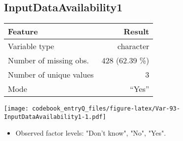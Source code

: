 \documentclass[]{article}
\providecommand{\tightlist}{%
  \setlength{\itemsep}{0pt}\setlength{\parskip}{0pt}}
\newcommand{\fullline}{\noindent\makebox[\linewidth]{\rule{\textwidth}{0.4pt}}}
\newcommand{\bminione}{\begin{minipage}{0.75 \textwidth}}
\newcommand{\bminitwo}{\begin{minipage}{0.25 \textwidth}}
\newcommand{\emini}{\end{minipage}}
\begin{document}
\fullline

\hypertarget{inputdataavailability1}{\subsection{InputDataAvailability1}\label{inputdataavailability1}}

\bminione

\begin{longtable}[]{@{}lr@{}}
\toprule
\begin{minipage}[b]{0.34\columnwidth}\raggedright\strut
Feature\strut
\end{minipage} & \begin{minipage}[b]{0.20\columnwidth}\raggedleft\strut
Result\strut
\end{minipage}\tabularnewline
\midrule
\endhead
\begin{minipage}[t]{0.34\columnwidth}\raggedright\strut
Variable type\strut
\end{minipage} & \begin{minipage}[t]{0.20\columnwidth}\raggedleft\strut
character\strut
\end{minipage}\tabularnewline
\begin{minipage}[t]{0.34\columnwidth}\raggedright\strut
Number of missing obs.\strut
\end{minipage} & \begin{minipage}[t]{0.20\columnwidth}\raggedleft\strut
428 (62.39 \%)\strut
\end{minipage}\tabularnewline
\begin{minipage}[t]{0.34\columnwidth}\raggedright\strut
Number of unique values\strut
\end{minipage} & \begin{minipage}[t]{0.20\columnwidth}\raggedleft\strut
3\strut
\end{minipage}\tabularnewline
\begin{minipage}[t]{0.34\columnwidth}\raggedright\strut
Mode\strut
\end{minipage} & \begin{minipage}[t]{0.20\columnwidth}\raggedleft\strut
``Yes''\strut
\end{minipage}\tabularnewline
\bottomrule
\end{longtable}

\emini
\bminitwo
\texttt{[image: codebook\_entryQ\_files/figure-latex/Var-93-InputDataAvailability1-1.pdf]}
\emini

\begin{itemize}
\tightlist
\item
  Observed factor levels: "Don't know", "No", "Yes".
\end{itemize}
\end{document}

